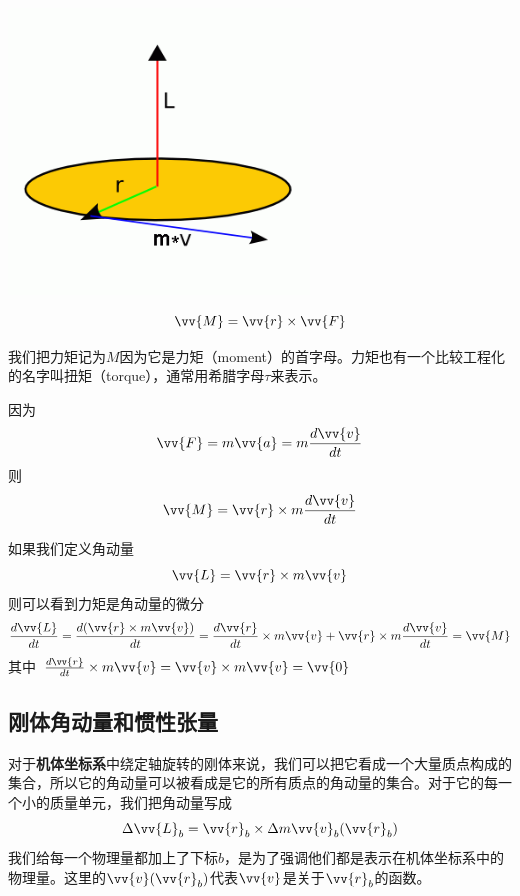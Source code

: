 \documentclass[11pt]{article}
\begin{document}
\begin{center}
\includegraphics[width=0.6\textwidth]{images/angularmomentum.png}
\end{center}

$$
\vv{M} = \vv{r} \times \vv{F}
$$

我们把力矩记为$M$因为它是力矩（moment）的首字母。力矩也有一个比较工程化的名字叫扭矩（torque），通常用希腊字母$\tau$来表示。

因为
$$
\vv{F} = m \vv{a} = m \frac{d\vv{v}}{dt}
$$
则
$$
\vv{M} = \vv{r} \times m \frac{d\vv{v}}{dt}
$$

如果我们定义角动量
$$
\vv{L} = \vv{r} \times m \vv{v}
$$
则可以看到力矩是角动量的微分
$$
\frac{d\vv{L}}{dt} = \frac{d(\vv{r} \times m \vv{v})}{dt} = \frac{d\vv{r}}{dt} \times m \vv{v} + \vv{r}\times m\frac{d\vv{v}}{dt} = \vv{M}
$$
其中
$
\frac{d\vv{r}}{dt} \times m \vv{v} = \vv{v} \times m \vv{v} = \vv{0} 
$
\subsection{刚体角动量和惯性张量}
对于\textbf{机体坐标系}中绕定轴旋转的刚体来说，我们可以把它看成一个大量质点构成的集合，所以它的角动量可以被看成是它的所有质点的角动量的集合。对于它的每一个小的质量单元，我们把角动量写成
$$
\Delta \vv{L}_b = \vv{r}_b \times \Delta m \vv{v}_b(\vv{r}_b)
$$
我们给每一个物理量都加上了下标$b$，是为了强调他们都是表示在机体坐标系中的物理量。这里的$\vv{v}(\vv{r}_b)$代表$\vv{v}$是关于$\vv{r}_b$的函数。
\end{document}
